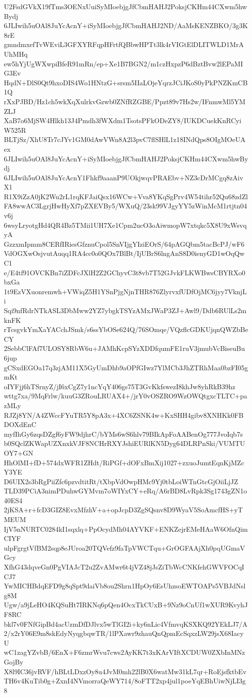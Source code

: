 U2FsdGVkX19fTms3OENxUuiSyMIoebjgJfCbmHAHJ2PoksjCKHm44CXwm5hwBydj
6JLIwih5uOAl8JuYcAcnY+iSyMIoebjgJfCbmHAHJ2ND/AaMsKENZBKO/3g3K8rE
gmndmxefTvWEviL3GFXYRFqpHFrtfQBbwHPTt3lk4rVIGtElDLITWLD1MrAUhMHq
ew5hYjUgWXwpiBfeR91mRn/ep+Xe1B7BGN2/m1czHxpzP6dBztBvw2lEPaMIG3Ev
HqdN+DlS0Qt9hxoDIS4Wo1HNtzG+srsm5IIaLOjeYqrzJCiJKoS0yPkPNZKmCB1Q
rXxPJBD/Hz1ch5wkXqXulrkvGzwb0ZNfRZGBE/Ppzt89v7Hs2w/IFnmwMl5YMZLJ
XaB7o6MjSW4Hlkh13J4Pmdh3fWXdm1TsotsPFkODeZY8/IUKDCuekKnRCyiW525R
BLTjSz/XhU8Tr7cJYv1GM0dAwVWn8A2l3pvC7flSHlL1z18INdQps8OIgMOeUAex
6JLIwih5uOAl8JuYcAcnY+iSyMIoebjgJfCbmHAHJ2PoksjCKHm44CXwm5hwBydj
6JLIwih5uOAl8JuYcAcnY1Fhkf9aaanP9UOkjwqvPRAEbv+NZ3cDrMCgq8zAivX1
R1X9iZzA0jK2Wu2rL1rqKFJaiQsx16WCw+Vva8YKqSgPrv4W54tihr52Qu68zdZl
FA8wwAC3LgrjHwHyXf7pZXEVBy5/WXuQ/23sk99VJgyYY5zWinMcM1rtjtn04v6j
6wsyLryotgHd4QR4Bz5TMii1UH7Xe1Cpm2ucO3oAiwmopW7xtqkc5X8U9xWsvqyA
GzzxmIpmm8CERfIRiesGfznuCpol5SnVIjgYIziEOrS/64pAGQbm5tacBcPJ/wF6
VdOGXwOsjvutAuqq1RA4cc0o0QOx7BlBt/IjUBrS6lngAnS8D0ienyGD1wOqQwC1
e/E4tf91OVCKBn7iZDFcJXlH2Z2GChyvC3t8vb7T52GJvkFLKWBwsCBYRXo0bxGa
1t9EzVXuonremwh+VWiqZ5H1YSnPjgNjnTHR876ZlyrvxfUDfOjMC6jyy7VknjLi
Sqi9nfRdrNTkASL3DbMww2YZ7ybgkTSYzAMxJWaP3ZJ+Awl9/Ddb6RUlLs2mknFK
rTcsgvkYmXaYACchJSmk/s6ssYbOSe624Q/76SOmqe/VQzflcGDKUjqnQWZbBeCY
2SebbClFAf7ULOSY8RbW6u+JAMhKcpSYzXDDfqumFE1ruV3jmubVcBiseuBu6jup
gCSxdEGOa17q3zjAM11X5GyUmDhb9aOPfGIwz7YlMCb3JhZTRhMaa0bzFI05gmKt
oIYFjj6hTSrnyZ/jI6xCgZ7y1ncYqY406gs75T3GvKkfswezI8khJw8yhRkB39hz
wttg7xa/9MqFrlw/kuuG3ZRouLRUAX4+/jrY0vOSZRO9WzOWQtgxcTLTC+pazMLy
RJZj8YN/A4ZWccFYuTR5Y8pA3x+4XC6ZSNK4w+KxSHH4gibv8XNHKk0FBDOXdEnC
myfIhGy6zqsDZgf6yFW9djhrC/bYMs6wS6hlv79BIkApFoAABenOg777JvoIqb7s
b0SQclZKWapUZXnxkVJF8NCHrRXYJshiEURlKN5Dyg64DLRPnSki/VUMTUOY7+GN
HhOlMI+fD+574dxWFR1ZHdt/RiPGf+dOFxBmXij1027+zxuoJumtEqnKjMZcY3YE
D6UIX2s3bRgPiiZfc6pzvdtitRt/tXbpVdOwpHMc9Yj0tbLoiWTnGtcGjOiiLjJZ
TLD39PCiA3nimPDuhwGYMvm7oWIYxCY+eRq/A6rBD8LvRpk3Sg1743gZN1o40ES4
2jKSA+r+fcD3GIZ8EvxMfzhV+a+opJcpD3ZgSQsnv8D9WyaV5SoAmcfHS+yTMEUM
IjV5nNURTC0284kI1sqxlq+PpOcydMh04AYVKF+ENKZejrEMeHAaW6OfnQimCIYF
ulpFgrgtVfBM2sqp8eJUroa20TQVefz9faTpVWCTqu+GrOGFAAjXh0pqUGmaVGcy
XfhG43dqveGn0PgVIAJcT2u2ZvAMwr6t4jVZ48jJsZiTbWcCNKfehGWVFOCqICJ7
YwMICHBdqEFD9g8qSpt9daiVb8ou2Shrn1HpOy6EsUhzsoEWTOAPs5VBJdNslg8M
Ugw/a9jLeHO4KQSuHt7IRKNq6pQen4OcxTkCUxB+9Nz9oCnUf1wXUR9KvyhJF8RC
bkl7v0FNfGipBd4acUzmDfDJlvx5wTlGI2i+ky6nLic4VfmvqKSXKQ92YEkLJ7/A
2/x2rY06E9m8skEdyNyqgbqwTR/1lPXawr9zhauQnQpmEcSqxzLW29jsX68IacyU
wC1zagYZvbB/6EnX+F6zmrWvu7cws2AyKK7t3xKArVIftXCDUW0ZXbInMNzGojBy
X8l9IC36jvRVF/hBLtLDxzOy8u4JvM0mh22lB0X6watMw31kL7qr+RoEjsfktbEv
TH6v4KuTib0g+ZxnI4NVmorraQeWY714/8oFTT2xp4jul1poeYqEBhUiwNjLI3g8
